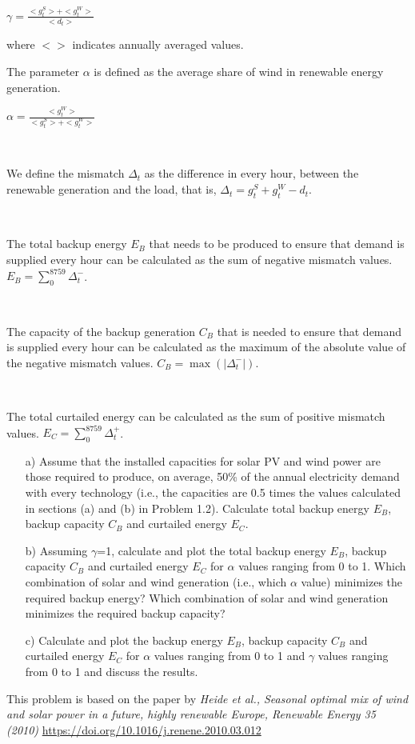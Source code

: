 \documentclass[10pt]{article}
\begin{document}
$\gamma=\frac{<g_t^S>+<g_t^W>}{<d_t>}$

where $<>$ indicates annually averaged values. 

The parameter $\alpha$ is defined as the average share of wind in renewable energy generation.

$\alpha=\frac{<g_t^W>}{<g_t^S>+<g_t^W>}$

\

We define the mismatch $\Delta_t$ as the difference in every hour, between the renewable generation and the load, that is, $\Delta_t=g_t^S+g_t^W-d_t$.

\

The total backup energy $E_B$ that needs to be produced to ensure that demand is supplied every hour can be calculated as the sum of negative mismatch values. $E_B=\sum_0^{8759} \Delta_t^{-}$.

\

The capacity of the backup generation $C_B$ that is needed to ensure that demand is supplied every hour can be calculated as the maximum of the absolute value of the negative mismatch values. $C_B=\max(|{\Delta_t^-}|)$.

\

The total curtailed energy can be calculated as the sum of positive mismatch values. 
$E_C=\sum_0^{8759} \Delta_t^{+}$.

\begin{enumerate}

\item[a)] Assume that the installed capacities for solar PV and wind power are those required to produce, on average, 50\% of the annual electricity demand with every technology (i.e., the capacities are 0.5 times the values calculated in sections (a) and (b) in Problem 1.2). Calculate total backup energy $E_B$, backup capacity $C_B$ and curtailed energy $E_C$.

\item[b)] Assuming $\gamma$=1, calculate and plot the total backup energy $E_B$, backup capacity $C_B$ and curtailed energy $E_C$ for $\alpha$ values ranging from 0 to 1. Which combination of solar and wind generation (i.e., which $\alpha$ value) minimizes the required backup energy? Which combination of solar and wind generation minimizes the required backup capacity?

\item[c)] Calculate and plot the backup energy $E_B$, backup capacity $C_B$ and curtailed energy $E_C$ for $\alpha$ values ranging from 0 to 1 and $\gamma$ values ranging from 0 to 1 and discuss the results.

\end{enumerate}
This problem is based on the paper by \textit{Heide et al., Seasonal optimal mix of wind and solar power in a future, highly renewable Europe, Renewable Energy 35 (2010)} \url{https://doi.org/10.1016/j.renene.2010.03.012}
\end{document}
